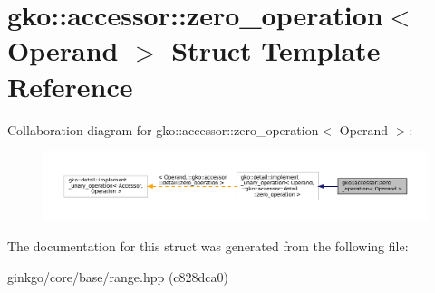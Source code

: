 \hypertarget{structgko_1_1accessor_1_1zero__operation}{}\section{gko\+:\+:accessor\+:\+:zero\+\_\+operation$<$ Operand $>$ Struct Template Reference}
\label{structgko_1_1accessor_1_1zero__operation}


Collaboration diagram for gko\+:\+:accessor\+:\+:zero\+\_\+operation$<$ Operand $>$\+:
\nopagebreak
\begin{figure}[H]
\begin{center}
\leavevmode
\includegraphics[width=350pt]{structgko_1_1accessor_1_1zero__operation__coll__graph}
\end{center}
\end{figure}


The documentation for this struct was generated from the following file\+:\begin{DoxyCompactItemize}
\item 
ginkgo/core/base/range.\+hpp (c828dca0)\end{DoxyCompactItemize}
